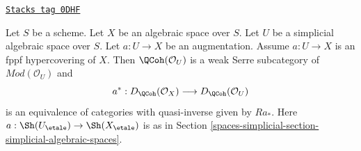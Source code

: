 \begin{lemma}
\label{spaces-simplicial-lemma-coh-descent-qcoh-unbounded-for-fppf-hypercovering}
\href{https://stacks.math.columbia.edu/tag/0DHF}{\texttt{Stacks tag 0DHF}}

Let $S$ be a scheme. Let $X$ be an algebraic space over $S$.
Let $U$ be a simplicial algebraic space over $S$. Let $a : U \to X$
be an augmentation. Assume $a : U \to X$ is an fppf hypercovering of $X$.
Then $\QCoh(\mathcal{O}_U)$ is a weak Serre subcategory of
$\textit{Mod}(\mathcal{O}_U)$ and
$$
a^* : D_\QCoh(\mathcal{O}_X) \longrightarrow D_\QCoh(\mathcal{O}_U)
$$
is an equivalence of categories with quasi-inverse given by
$Ra_*$. Here $a : \Sh(U_\etale) \to \Sh(X_\etale)$
is as in Section \ref{spaces-simplicial-section-simplicial-algebraic-spaces}.
\end{lemma}


